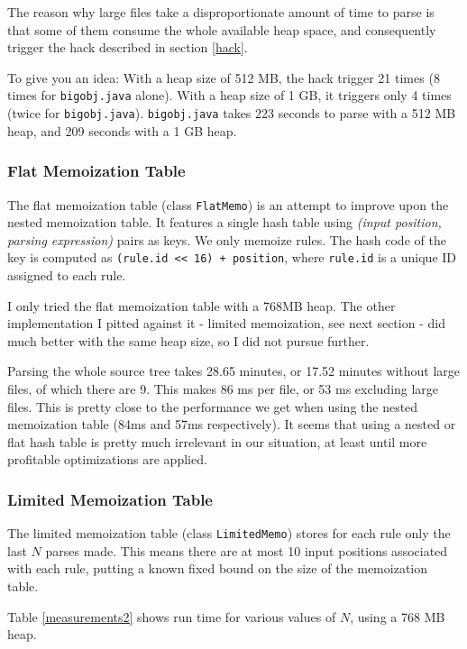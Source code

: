 The reason why large files take a disproportionate amount of time to parse is
that some of them consume the whole available heap space, and consequently
trigger the hack described in section \ref{hack}.

To give you an idea: With a heap size of 512 MB, the hack trigger 21 times (8
times for \texttt{bigobj.java} alone). With a heap size of 1 GB, it triggers
only 4 times (twice for \texttt{bigobj.java}). \texttt{bigobj.java} takes 223
seconds to parse with a 512 MB heap, and 209 seconds with a 1 GB heap.

\subsubsection{Flat Memoization Table}

The flat memoization table (class \texttt{FlatMemo}) is an attempt to improve
upon the nested memoization table. It features a single hash table using
\emph{(input position, parsing expression)} pairs as keys. We only memoize
rules. The hash code of the key is computed as \texttt{(rule.id << 16) +
  position}, where \texttt{rule.id} is a unique ID assigned to each rule.

I only tried the flat memoization table with a 768MB heap. The other
implementation I pitted against it - limited memoization, see next section - did
much better with the same heap size, so I did not pursue further.

Parsing the whole source tree takes 28.65 minutes, or 17.52 minutes without
large files, of which there are 9. This makes 86 ms per file, or 53 ms excluding
large files. This is pretty close to the performance we get when using the
nested memoization table (84ms and 57ms respectively). It seems that using a
nested or flat hash table is pretty much irrelevant in our situation, at least
until more profitable optimizations are applied.

\subsubsection{Limited Memoization Table}

The limited memoization table (class \texttt{LimitedMemo}) stores for each rule
only the last $N$ parses made. This means there are at most 10 input positions
associated with each rule, putting a known fixed bound on the size of the
memoization table.

Table \ref{measurements2} shows run time for various values of $N$, using a 768
MB heap.

